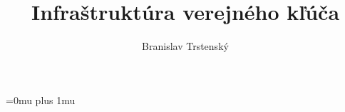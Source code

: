 \documentclass[10pt,slovak,a4paper]{article}
\title{Infraštruktúra verejného kľúča}
\author{Branislav Trstenský\\[2pt]}
\begin{document}
\maketitle



\Urlmuskip=0mu plus 1mu
\def\UrlBreaks{\do\/\do-}
\end{document}
